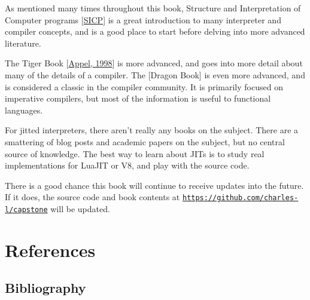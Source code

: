 \documentclass{book}
\newcommand{\sectionNewpage}{}
\let\SOriginalthesubsection\thesubsection
\newcommand{\Ssection}[2]{\section[#1]{#2}\let\thesubsection\SOriginalthesubsection}
\newcommand{\Ssubsectionstar}[1]{\subsection*{#1}\renewcommand*\thesubsubsection{\arabic{section}.\arabic{subsubsection}}\setcounter{subsubsection}{0}}
\newcommand{\Ssubsectionstarx}[2]{\Ssubsectionstar{#2}\addcontentsline{toc}{subsection}{#1}}
\newcommand{\Snolinkurl}[1]{\nolinkurl{#1}}
\renewcommand{\Ssection}[2]{\chapter[#1]{#2}}
\renewcommand{\Ssubsectionstar}[1]{\section*{#1}}
\renewcommand{\Ssubsectionstarx}[2]{\Ssubsectionstar{#2}\addcontentsline{toc}{section}{#1}}
\begin{document}
As mentioned many times throughout this book, Structure and Interpretation
of Computer programs [\hyperref[t:x28cite_x22SICPx22x29]{SICP}] is a great introduction to many
interpreter and compiler concepts, and is a good place to start before
delving into more advanced literature.

The Tiger Book [\hyperref[t:x28cite_x22Appelx2c_1998x22x29]{Appel, 1998}] is more advanced, and goes into more
detail about many of the details of a compiler. The [Dragon Book] is
even more advanced, and is considered a classic in the compiler community.
It is primarily focused on imperative compilers, but most of the
information is useful to functional languages.

For jitted interpreters, there aren{'}t really any books on the subject.
There are a smattering of blog posts and academic papers on the subject,
but no central source of knowledge. The best way to learn about JITs is to
study real implementations for LuaJIT or V8, and play with the source
code.

There is a good chance this book will continue to receive updates into the
future. If it does, the source code and book contents at
\href{https://github.com/charles-l/capstone}{\Snolinkurl{https://github.com/charles-l/capstone}} will be updated.

\sectionNewpage

\Ssection{References}{References}\label{t:x28part_x22Referencesx22x29}

\label{t:x28part_x28gentag_0x29x29}



\Ssubsectionstarx{Bibliography}{Bibliography}\label{t:x28part_x22docx2dbibliographyx22x29}
\end{document}
